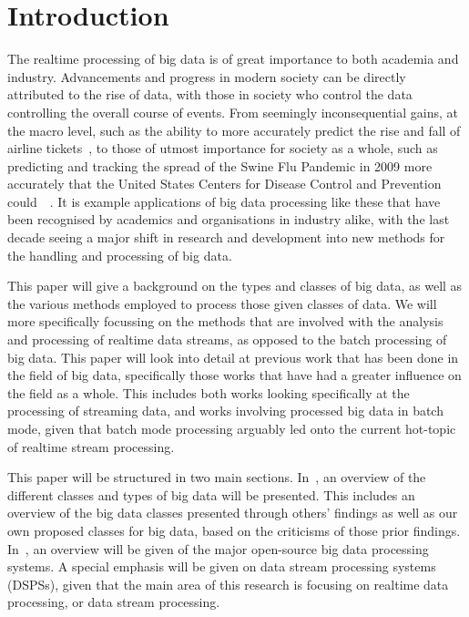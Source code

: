 \documentclass[a4paper,11pt]{article}
\begin{document}
\section{Introduction} %
\label{sec:introduction}

The realtime processing of big data is of great importance to both academia and industry. Advancements and progress in
modern society can be directly attributed to the rise of data, with those in society who control the data controlling
the overall course of events. From seemingly inconsequential gains, at the macro level, such as the ability to more
accurately predict the rise and fall of airline tickets~\cite{darlin2006airfares}, to those of utmost importance for
society as a whole, such as predicting and tracking the spread of the Swine Flu Pandemic in 2009 more accurately that
the United States Centers for Disease Control and Prevention could~\cite{ritterman2009using}~\cite{mayer2013big}. It is
example applications of big data processing like these that have been recognised by academics and organisations in
industry alike, with the last decade seeing a major shift in research and development into new methods for the handling
and processing of big data.

This paper will give a background on the types and classes of big data, as well as the various methods employed to
process those given classes of data. We will more specifically focussing on the methods that are involved with the
analysis and processing of realtime data streams, as opposed to the batch processing of big data. This paper will look
into detail at previous work that has been done in the field of big data, specifically those works that have had a
greater influence on the field  as a whole. This includes both works looking specifically at the processing of streaming
data, and works involving processed big data in batch mode, given that batch mode processing arguably led onto the
current hot-topic of realtime stream processing.

This paper will be structured in two main sections. In~, an overview of the different
classes and types of big data will be presented. This includes an overview of the big data classes presented through others' findings
as well as our own proposed classes for big data, based on the criticisms of those prior findings. In~,
an overview will be given of the major open-source big data processing systems. A special emphasis will be given on data stream processing
systems (DSPSs), given that the main area of this research is focusing on realtime data processing, or data stream processing.
\end{document}
